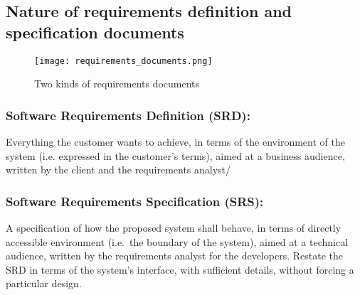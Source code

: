 \subsection{Nature of requirements definition and specification documents}

\begin{figure}[!ht]
    \centering
    \texttt{[image: requirements\_documents.png]}
    \caption{Two kinds of requirements documents}
\end{figure}

\subsubsection{Software Requirements Definition (SRD):}
Everything the customer wants to achieve, in terms of the environment of the system (i.e.
expressed in the customer’s terms), aimed at a business audience, written by the client and
the requirements analyst/

\subsubsection{Software Requirements Specification (SRS):}

A specification of how the proposed system shall behave, in terms of directly accessible
environment (i.e.\ the boundary of the system), aimed at a technical audience, written by
the requirements analyst for the developers.
Restate the SRD in terms of the system’s interface, with sufficient details, without forcing a
particular design.
